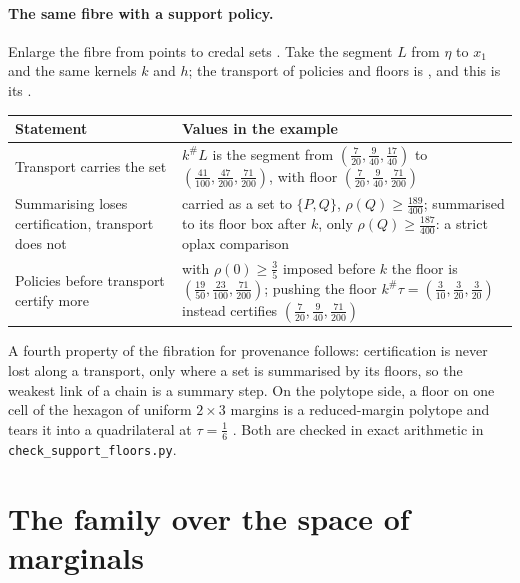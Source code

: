 \documentclass[11pt]{article}
\theoremstyle{definition}
\theoremstyle{remark}
\begin{document}
\paragraph{The same fibre with a support policy.} Enlarge the fibre from points to credal sets
\cite[Def.~3.5, Prop.~3.6]{Conditionals}. Take the segment $L$ from $\eta$ to $x_1$ and the same kernels $k$ and $h$; the
transport of policies and floors is \cite[Prop.~10.24, Thm.~10.26]{Tower}, and this is its \cite[Ex.~10.27]{Tower}.
\begin{center}\small
\begin{tabular}{@{}R{0.3\textwidth}R{0.62\textwidth}@{}}
\toprule
Statement & Values in the example\\
\midrule
Transport carries the set & $k^\#L$ is the segment from $(\tfrac7{20},\tfrac9{40},\tfrac{17}{40})$ to $(\tfrac{41}{100},\tfrac{47}{200},\tfrac{71}{200})$, with
floor $(\tfrac7{20},\tfrac9{40},\tfrac{71}{200})$\\\addlinespace[2pt]
Summarising loses certification, transport does not & carried as a set to $\{P,Q\}$, $\rho(Q)\ge\tfrac{189}{400}$; summarised to its floor box after $k$, only
$\rho(Q)\ge\tfrac{187}{400}$: a strict oplax comparison\\\addlinespace[2pt]
Policies before transport certify more & with $\rho(0)\ge\tfrac35$ imposed before $k$ the floor is $(\tfrac{19}{50},\tfrac{23}{100},\tfrac{71}{200})$; pushing the
floor $k^\#\tau=(\tfrac3{10},\tfrac3{20},\tfrac3{20})$ instead certifies $(\tfrac7{20},\tfrac9{40},\tfrac{71}{200})$\\
\bottomrule
\end{tabular}
\end{center}
A fourth property of the fibration for provenance follows: certification is never lost along a transport, only where a set is
summarised by its floors, so the weakest link of a chain is a summary step. On the polytope side, a floor on one cell of the
hexagon of uniform $2\times3$ margins is a reduced-margin polytope and tears it into a quadrilateral at $\tau=\tfrac16$
\cite[Prop.~6.9, Ex.~6.10]{Conditionals}. Both are checked in exact arithmetic in \texttt{check\_support\_floors.py}.

\section{The family over the space of marginals}\label{sec:family}
\end{document}
